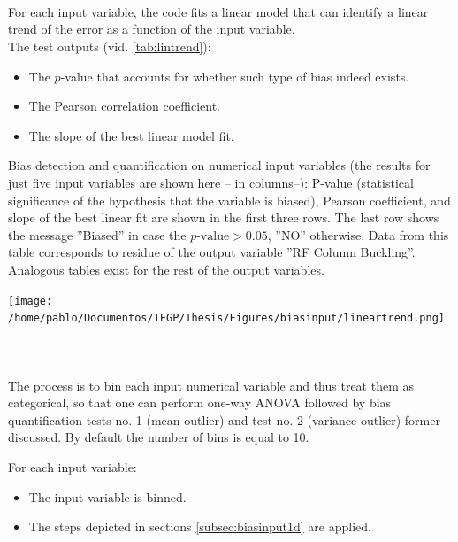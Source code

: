 \paragraph{ \\}
For each input variable, the code fits a linear model that can identify a linear trend of the error as a function of the input variable.\\
The test outputs (vid. \autoref{tab:lintrend}):
\begin{itemize}
	\item The $p$-value that accounts for whether such type of bias indeed exists.
	\item The Pearson correlation coefficient.
	\item The slope of the best linear model fit.
\end{itemize}
 
\begin{table}[!htb]
	\centering
	\caption{Bias detection and quantification on numerical input variables (the results for just five input variables are shown here -- in columns--): P-value (statistical significance of the hypothesis that the variable is biased), Pearson coefficient, and slope of the best linear fit are shown in the first three rows. The last row shows the message ''Biased'' in case the $p\text{-value}>0.05$, ''NO'' otherwise. Data from this table corresponds to residue of the output variable ''RF Column Buckling''. Analogous tables exist for the rest of the output variables.}
	\texttt{[image: /home/pablo/Documentos/TFGP/Thesis/Figures/biasinput/lineartrend.png]}
	\label{tab:lintrend}
\end{table}

\paragraph{ \\}
The process is to bin each input numerical variable and thus treat them as categorical, so that one can perform one-way ANOVA followed by bias quantification tests no. 1 (mean outlier) and test no. 2 (variance outlier) former discussed. By default the number of bins is equal to 10.

For each input variable:
\begin{itemize}
	\item The input variable is binned.
	\item The steps depicted in sections \autoref{subsec:biasinput1d} are applied.
\end{itemize}

